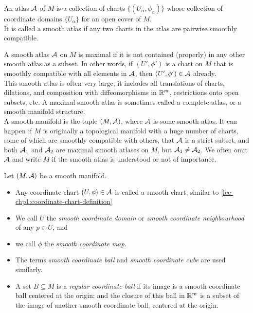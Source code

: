 \documentclass[../main-manifolds.tex]{subfiles}
\begin{document}
\begin{definition}\label{lee-chp1:smooth-atlas}
    An atlas $\mathcal{A}$ of $M$ is a collection of charts $\{(U_\alpha, \phi_\alpha)\}$ whose collection of coordinate domains $\{U_\alpha\}$ for an open cover of $M$.\\ It is called a smooth atlas if any two charts in the atlas are pairwise smoothly compatible.
\end{definition}

\begin{definition}\label{lee-chp1:smooth-manifold}
    A smooth atlas $\mathcal{A}$ on $M$ is maximal if it is not contained (properly) in any other smooth atlas as a subset. In other words, if $(U',\phi')$ is a chart on $M$ that is smoothly compatible with all elements in $\mathcal{A}$, then $(U',\phi')\in\mathcal{A}$ already.\\
    
    This smooth atlas is often very large, it includes all translations of charts, dilations, and composition with diffeomorphisms in ${\mathbb{R}^m}$, restrictions onto open subsets, etc. A maximal smooth atlas is sometimes called a complete atlas, or a smooth manifold structure.\\

    A smooth manifold is the tuple $(M,\mathcal{A})$, where $\mathcal{A}$ is some smooth atlas. It can happen if $M$ is originally a topological manifold with a huge number of charts, some of which are smoothly compatible with others, that $\mathcal{A}$ is a strict subset, and both $\mathcal{A}_1$ and $\mathcal{A}_2$ are maximal smooth atlases on $M$, but $\mathcal{A}_1\neq\mathcal{A}_2$. We often omit $\mathcal{A}$ and write $M$ if the smooth atlas is understood or not of importance.
\end{definition}

\begin{definition}\label{lee-chp1:smooth-coordinate-definitions}
    Let $(M,\mathcal{A})$ be a smooth manifold. 
    \begin{itemize}
        \item Any coordinate chart $(U,\phi)\in\mathcal{A}$ is called a smooth chart, similar to \cref{lee-chp1:coordinate-chart-definition}
        \item We call $U$ the \emph{smooth coordinate domain} or \emph{smooth coordinate neighbourhood} of any $p\in U$, and
        \item we call $\phi$ the \emph{smooth coordinate map}.
        \item The terms \emph{smooth coordinate ball} and \emph{smooth coordinate cube} are used similarly.
        \item A set $B\subseteq M$ is a \emph{regular coordinate ball} if its image is a smooth coordinate ball centered at the origin; and the closure of this ball in ${\mathbb{R}^m}$ is a subset of the image of another smooth coordinate ball, centered at the origin.
    \end{itemize}
\end{definition}
\end{document}
